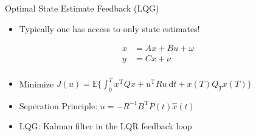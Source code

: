 \documentclass[handout]{beamer}
\begin{document}
%
\begin{frame}{Optimal State Estimate Feedback (LQG)}
\begin{itemize}
\item Typically one has access to only state estimates!
\end{itemize}
\begin{equation}
\begin{aligned}
\dot{x} &= Ax + Bu + \omega \\
y &= Cx + \nu \\
\end{aligned}
\end{equation}
\begin{itemize}
\item Minimize $J(u) = \mathbb{E}\Big\{\int_{0}^{T} x^{\mathrm{T}}Qx + u^{\mathrm{T}}Ru \ \mathrm{d}t + x(T)Q_{T}x(T)\Big\}$
\item Seperation Principle: $u = -R^{-1}B^{\mathrm{T}}P(t)\hat{x}(t)$
\end{itemize}
\begin{itemize}
\item LQG: Kalman filter in the LQR feedback loop
\end{itemize}
\end{frame}
%
\end{document}

